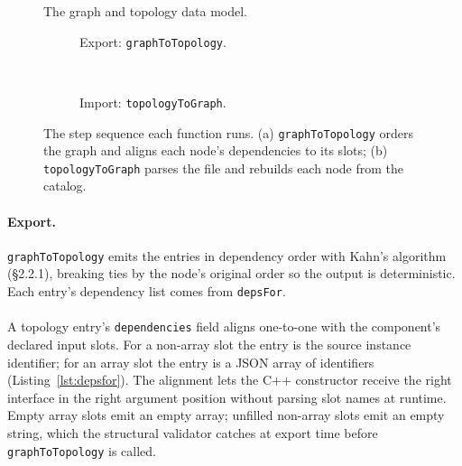 \clearpage
\begin{figure}[H]
    \centering
    \resizebox{0.96\textwidth}{!}{
        
    }
    \caption[The graph and topology data model.]{The graph and topology data model.}
    \label{fig:domain-classes}
\end{figure}

\begin{figure}[H]
    \centering
    \begin{subfigure}{\textwidth}
        \centering
        \resizebox{0.7\textwidth}{!}{}
        \caption{Export: \texttt{graphToTopology}.}
        \label{fig:topology-functions-export}
    \end{subfigure}\\[6pt]
    \begin{subfigure}{\textwidth}
        \centering
        \resizebox{0.7\textwidth}{!}{}
        \caption{Import: \texttt{topologyToGraph}.}
        \label{fig:topology-functions-import}
    \end{subfigure}
    \caption[The export and import function pipelines.]{The step sequence each function runs. (a) \texttt{graphToTopology} orders the graph and aligns each node's dependencies to its slots; (b) \texttt{topologyToGraph} parses the file and rebuilds each node from the catalog.}
    \label{fig:topology-functions}
\end{figure}

\pagebreak

\paragraph{Export.}
\texttt{graphToTopology} emits the entries in dependency order with Kahn's algorithm (\S2.2.1), breaking ties by the node's original order so the output is deterministic. Each entry's dependency list comes from \texttt{depsFor}.

\paragraph{}
A topology entry's \texttt{dependencies} field aligns one-to-one with the component's declared input slots. For a non-array slot the entry is the source instance identifier; for an array slot the entry is a JSON array of identifiers (Listing~\ref{lst:depsfor}). The alignment lets the C++ constructor receive the right interface in the right argument position without parsing slot names at runtime. Empty array slots emit an empty array; unfilled non-array slots emit an empty string, which the structural validator catches at export time before \texttt{graphToTopology} is called.

